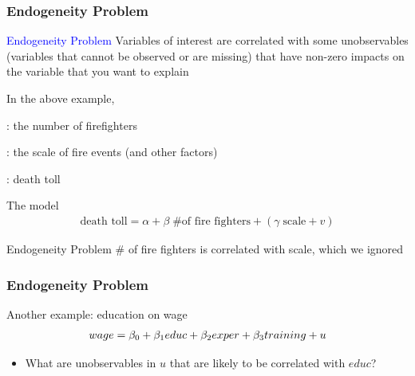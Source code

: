\documentclass[fleqn]{beamer}\usepackage[]{graphicx}\usepackage[]{color}
\begin{document}
\begin{frame}[c]
  \frametitle{Endogeneity Problem}
  \begin{block}{\textcolor{blue}{Endogeneity Problem}}
    Variables of interest are correlated with some unobservables (variables that cannot be observed or are missing) that have non-zero impacts on the variable that you want to explain
  \end{block}
\end{frame}

\begin{frame}[c]
  \begin{block}{In the above example,}
    \begin{description}
      \item [variable of interest]: the number of firefighters
      \item [unobservables]: the scale of fire events (and other factors)
      \item [variable to explain]: death toll
    \end{description}
  \end{block}

  \begin{block}{The model}
    \begin{align*}
      \mbox{death toll} = \alpha + \beta\; \mbox{\# of fire fighters} + (\gamma\; \mbox{scale} + v)
    \end{align*}
  \end{block}

  \begin{block}{Endogeneity Problem}  
    \# of fire fighters is correlated with scale, which we ignored
  \end{block}

\end{frame}

\begin{frame}[c]
  \frametitle{Endogeneity Problem}
  \begin{block}{Another example: education on wage}
    \begin{align*}
    wage = \beta_0 + \beta_1 educ + \beta_2 exper + \beta_3 training + u \notag
    \end{align*}
    \begin{itemize}
      \item What are unobservables in $u$ that are likely to be correlated with $educ$?
    \end{itemize}
  \end{block}
\end{frame}
\end{document}
